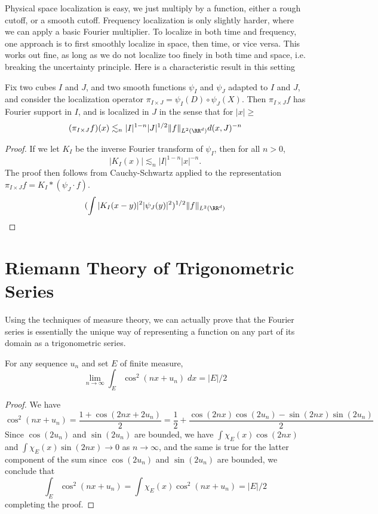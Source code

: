 Physical space localization is easy, we just multiply by a function, either a rough cutoff, or a smooth cutoff. Frequency localization is only slightly harder, where we can apply a basic Fourier multiplier. To localize in both time and frequency, one approach is to first smoothly localize in space, then time, or vice versa. This works out fine, as long as we do not localize too finely in both time and space, i.e. breaking the uncertainty principle. Here is a characteristic result in this setting

\begin{lemma}
  Fix two cubes $I$ and $J$, and two smooth functions $\psi_I$ and $\psi_J$ adapted to $I$ and $J$, and consider the localization operator $\pi_{I \times J} = \psi_I(D) \circ \psi_J(X)$. Then $\pi_{I \times J} f$ has Fourier support in $I$, and is localized in $J$ in the sense that for $|x| \geq $
  \[ (\pi_{I \times J} f)(x) \lesssim_n |I|^{1-n} |J|^{1/2} \| f \|_{L^2(\RR^d)} d(x,J)^{-n} \]
\end{lemma}
\begin{proof}
  If we let $K_I$ be the inverse Fourier transform of $\psi_I$, then for all $n > 0$,
  \[ |K_I(x)| \lesssim_n |I|^{1-n} |x|^{-n}. \]
  The proof then follows from Cauchy-Schwartz applied to the representation $\pi_{I \times J} f = K_I * (\psi_J \cdot f)$.
  \[ (\int |K_I(x-y)|^2 |\psi_J(y)|^2)^{1/2} \| f \|_{L^2(\RR^d)} \]
\end{proof}














\chapter{Riemann Theory of Trigonometric Series}

Using the techniques of measure theory, we can actually prove that the Fourier series is essentially the unique way of representing a function on any part of its domain as a trigonometric series.

\begin{lemma}
  For any sequence $u_n$ and set $E$ of finite measure,
  \[ \lim_{n \to \infty} \int_E \cos^2(nx + u_n)\; dx = |E|/2 \]
\end{lemma}
\begin{proof}
  We have
  \[ \cos^2(nx + u_n) = \frac{1 + \cos(2nx + 2u_n)}{2} = \frac{1}{2} + \frac{\cos(2nx) \cos(2u_n) - \sin(2nx) \sin(2u_n)}{2} \]
  Since $\cos(2u_n)$ and $\sin(2u_n)$ are bounded, we have $\int \chi_E(x) \cos(2nx)$ and $\int \chi_E(x) \sin(2nx) \to 0$ as $n \to \infty$, and the same is true for the latter component of the sum since $\cos(2u_n)$ and $\sin(2u_n)$ are bounded, we conclude that
  \[ \int_E \cos^2(nx + u_n) = \int \chi_E(x) \cos^2(nx + u_n) = |E|/2 \]
  completing the proof.
\end{proof}

